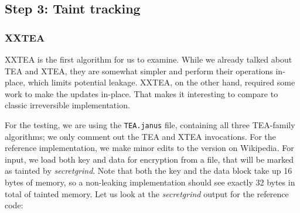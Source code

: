 \documentclass[a4paper,10pt,openright]{memoir}
\newcommand{\term}[1]{\textit{#1}}
\newcommand{\code}[1]{\texttt{#1}}
\begin{document}
\subsection{Step 3: Taint tracking}

\subsubsection{XXTEA}

XXTEA is the first algorithm for us to examine. While we already talked 
about TEA and XTEA, they are somewhat simpler and perform their 
operations in-place, which limits potential leakage. XXTEA, on the 
other hand, required some work to make the updates in-place. That makes 
it interesting to compare to classic irreversible implementation.

For the testing, we are using the \code{TEA.janus} file, containing all 
three TEA-family algorithms; we only comment out the TEA and XTEA 
invocations. For the reference implementation, we make minor edits to 
the version on Wikipedia\cite{xxtea-wiki}. For input, we load 
both key and data for encryption from a file, that will be marked as 
tainted by \term{secretgrind}. Note that both the key and the data 
block take up 16 bytes of memory, so a non-leaking implementation 
should see exactly 32 bytes in total of tainted memory. Let us look at 
the \term{secretgrind} output for the reference code:
\end{document}
